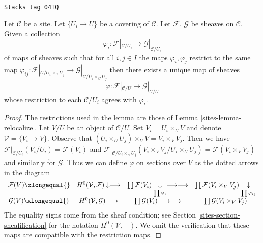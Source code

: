 \begin{lemma}
\label{sites-lemma-glue-maps}
\href{https://stacks.math.columbia.edu/tag/04TQ}{\texttt{Stacks tag 04TQ}}


Let $\mathcal{C}$ be a site.
Let $\{U_i \to U\}$ be a covering of $\mathcal{C}$.
Let $\mathcal{F}$, $\mathcal{G}$ be sheaves on $\mathcal{C}$.
Given a collection
$$
\varphi_i :
\mathcal{F}|_{\mathcal{C}/U_i}
\longrightarrow
\mathcal{G}|_{\mathcal{C}/U_i}
$$
of maps of sheaves such that for all $i, j \in I$ the maps
$\varphi_i, \varphi_j$ restrict to the same map
$\varphi_{ij} : \mathcal{F}|_{\mathcal{C}/U_i \times_U U_j} \to
\mathcal{G}|_{\mathcal{C}/U_i \times_U U_j}$
then there exists a unique map of sheaves
$$
\varphi :
\mathcal{F}|_{\mathcal{C}/U}
\longrightarrow
\mathcal{G}|_{\mathcal{C}/U}
$$
whose restriction to each $\mathcal{C}/U_i$ agrees with $\varphi_i$.
\end{lemma}

\begin{proof}

The restrictions used in the lemma are those of
Lemma \ref{sites-lemma-relocalize}.
Let $V/U$ be an object of $\mathcal{C}/U$.
Set $V_i = U_i \times_U V$ and denote $\mathcal{V} = \{V_i \to V\}$.
Observe that $(U_i \times_U U_j) \times_U V = V_i \times_V V_j$.
Then we have
$\mathcal{F}|_{\mathcal{C}/U_i}(V_i/U_i) = \mathcal{F}(V_i)$
and
$\mathcal{F}|_{\mathcal{C}/U_i \times_U U_j}(V_i \times_V V_j/U_i \times_U U_j)
= \mathcal{F}(V_i \times_V V_j)$
and similarly for $\mathcal{G}$.
Thus we can define $\varphi$ on sections over $V$
as the dotted arrows in the diagram
$$
\begin{array}{cccc}\mathcal{F}(V) \xlongequal{} & H^0(\mathcal{V}, \mathcal{F}) \downarrow\longrightarrow & \prod \mathcal{F}(V_i)
\underset{\prod \varphi_i}{\downarrow}\longrightarrow\longrightarrow & \prod \mathcal{F}(V_i \times_V V_j) \underset{\prod \varphi_{ij}}{\downarrow} \\ \mathcal{G}(V) \xlongequal{} & H^0(\mathcal{V}, \mathcal{G}) \longrightarrow & \prod \mathcal{G}(V_i)
\longrightarrow\longrightarrow & \prod \mathcal{G}(V_i \times_V V_j)\end{array}
$$
The equality signs come from the sheaf condition; see
Section \ref{sites-section-sheafification} for the notation
$H^0(\mathcal{V}, -)$.
We omit the verification that these maps are compatible
with the restriction maps.
\end{proof}

